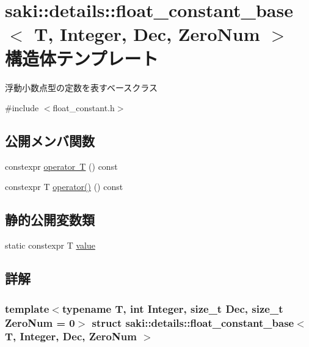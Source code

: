 \hypertarget{structsaki_1_1details_1_1float__constant__base}{}\section{saki\+:\+:details\+:\+:float\+\_\+constant\+\_\+base$<$ T, Integer, Dec, Zero\+Num $>$ 構造体テンプレート}
\label{structsaki_1_1details_1_1float__constant__base}


浮動小数点型の定数を表すベースクラス  




{\ttfamily \#include $<$float\+\_\+constant.\+h$>$}

\subsection*{公開メンバ関数}
\begin{DoxyCompactItemize}
\item 
constexpr \mbox{\hyperlink{structsaki_1_1details_1_1float__constant__base_a35b0e1f79344dc7f1dff6ed2b6209c7d}{operator T}} () const
\item 
constexpr T \mbox{\hyperlink{structsaki_1_1details_1_1float__constant__base_a914139c26ddf5f9664b381a51e6423d4}{operator()}} () const
\end{DoxyCompactItemize}
\subsection*{静的公開変数類}
\begin{DoxyCompactItemize}
\item 
static constexpr T \mbox{\hyperlink{structsaki_1_1details_1_1float__constant__base_a7c1fcb103a7419a7812cf095f1ffff61}{value}}
\end{DoxyCompactItemize}


\subsection{詳解}
\subsubsection*{template$<$typename T, int Integer, size\+\_\+t Dec, size\+\_\+t Zero\+Num = 0$>$\newline
struct saki\+::details\+::float\+\_\+constant\+\_\+base$<$ T, Integer, Dec, Zero\+Num $>$}


